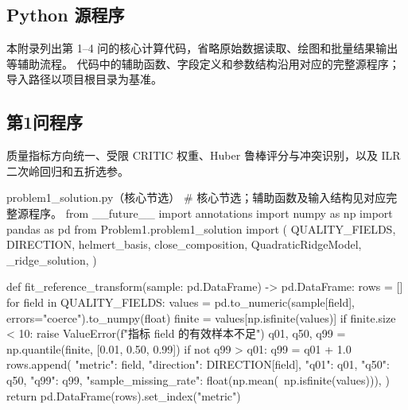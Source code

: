 \documentclass[bwprint]{gmcmthesis}
\numberwithin{equation}{section}
\numberwithin{figure}{section}
\numberwithin{table}{section}
\begin{document}
\clearpage
\begin{appendices}
\section{Python 源程序}    %
\renewcommand{\thesubsection}{A\thinskip.\thinskip\arabic{subsection}}
\setcounter{subsection}{0}

\begingroup
{}

本附录列出第 1--4 问的核心计算代码，省略原始数据读取、绘图和批量结果输出等辅助流程。
代码中的辅助函数、字段定义和参数结构沿用对应的完整源程序；导入路径以项目根目录为基准。

\subsection{第1问程序}  %
质量指标方向统一、受限 CRITIC 权重、Huber 鲁棒评分与冲突识别，以及 ILR 二次岭回归和五折选参。

\vspace{-2ex}
\begin{Python}{problem1\_solution.py（核心节选）}
# 核心节选；辅助函数及输入结构见对应完整源程序。
from __future__ import annotations
import numpy as np
import pandas as pd
from Problem1.problem1_solution import (
    QUALITY_FIELDS, DIRECTION, helmert_basis, close_composition,
    QuadraticRidgeModel, _ridge_solution,
)


def fit_reference_transform(sample: pd.DataFrame) -> pd.DataFrame:
    rows = []
    for field in QUALITY_FIELDS:
        values = pd.to_numeric(sample[field], errors="coerce").to_numpy(float)
        finite = values[np.isfinite(values)]
        if finite.size < 10:
            raise ValueError(f"指标 {field} 的有效样本不足")
        q01, q50, q99 = np.quantile(finite, [0.01, 0.50, 0.99])
        if not q99 > q01:
            q99 = q01 + 1.0
        rows.append(
            {
                "metric": field,
                "direction": DIRECTION[field],
                "q01": q01,
                "q50": q50,
                "q99": q99,
                "sample_missing_rate": float(np.mean(~np.isfinite(values))),
            }
        )
    return pd.DataFrame(rows).set_index("metric")



\end{Python}
\end{appendices}
\end{document}
